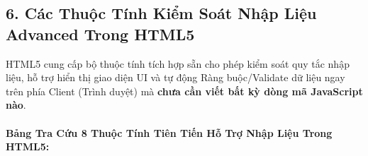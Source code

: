 \documentclass[11pt,oneside]{book}
\begin{document}
\subsection{6. Các Thuộc Tính Kiểm Soát Nhập Liệu Advanced Trong HTML5}



\begin{conceptBox}
HTML5 cung cấp bộ thuộc tính tích hợp sẵn cho phép kiểm soát quy tắc nhập liệu, hỗ trợ hiển thị giao diện UI và tự động Ràng buộc/Validate dữ liệu ngay trên phía Client (Trình duyệt) mà \textbf{chưa cần viết bất kỳ dòng mã JavaScript nào}.
\end{conceptBox}

\paragraph{Bảng Tra Cứu 8 Thuộc Tính Tiên Tiến Hỗ Trợ Nhập Liệu Trong HTML5:}
\end{document}
